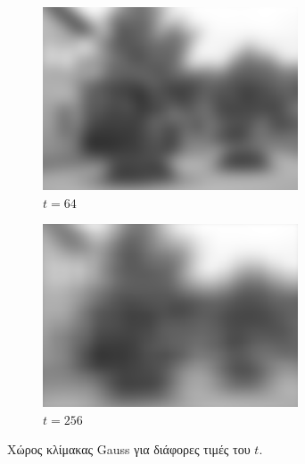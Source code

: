 \documentclass[a4paper,12pt]{article}
\begin{document}
\begin{figure}[h]
    \begin{subfigure}[b]{0.4\linewidth}
    \includegraphics[width=\linewidth]{Scalespace4.png}
    \caption{$t=64$}
    \end{subfigure}
    \begin{subfigure}[b]{0.4\linewidth}
    \includegraphics[width=\linewidth]{Scalespace5.png}
    \caption{$t=256$}
    \end{subfigure}

    \caption{Χώρος κλίμακας Gauss για διάφορες τιμές του $t$.}
\end{figure}

\newpage

\printbibliography
\end{document}
